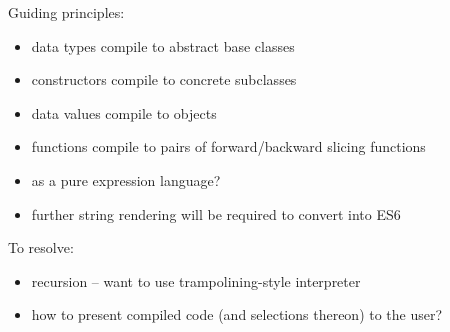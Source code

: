 
Guiding principles:
\begin{itemize}
   \item data types compile to abstract base classes
   \item constructors compile to concrete subclasses
   \item data values compile to objects
   \item functions compile to pairs of forward/backward slicing functions
   \item \JSCore as a pure expression language?
   \item further string rendering will be required to convert \JSCore into ES6
\end{itemize}

\noindent To resolve:
\begin{itemize}
   \item recursion -- want to use trampolining-style interpreter
   \item how to present compiled code (and selections thereon) to the user?
\end{itemize}



